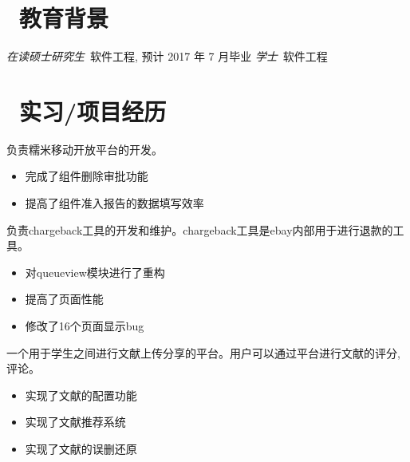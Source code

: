 \documentclass{resume}
\begin{document}



\section{\faGraduationCap\  教育背景}
\textit{在读硕士研究生}\ 软件工程, 预计 2017 年 7 月毕业
\textit{学士}\ 软件工程

\section{\faUsers\ 实习/项目经历}

负责糯米移动开放平台的开发。
\begin{itemize}
  \item 完成了组件删除审批功能
  \item 提高了组件准入报告的数据填写效率
\end{itemize}

负责chargeback工具的开发和维护。chargeback工具是ebay内部用于进行退款的工具。
\begin{itemize}
  \item 对queueview模块进行了重构
  \item 提高了页面性能
  \item 修改了16个页面显示bug
\end{itemize}

\begin{onehalfspacing}
一个用于学生之间进行文献上传分享的平台。用户可以通过平台进行文献的评分,评论。
\begin{itemize}
  \item 实现了文献的配置功能
  \item 实现了文献推荐系统
  \item 实现了文献的误删还原
\end{itemize}
\end{onehalfspacing}
\end{document}
